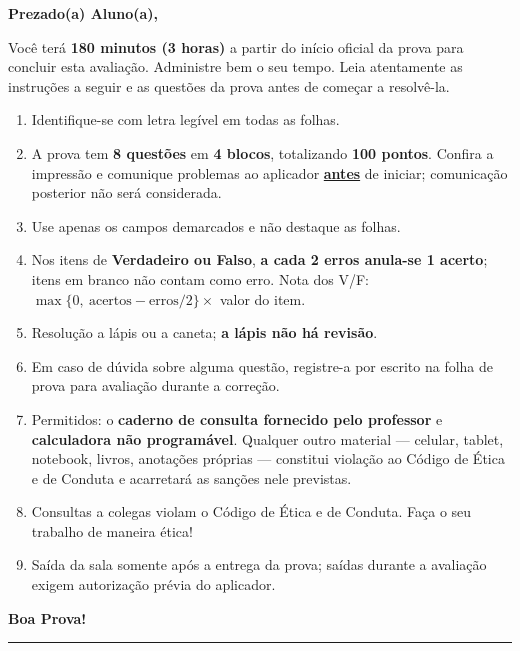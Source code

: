 \textbf{Prezado(a) Aluno(a),}

Você terá \textbf{180 minutos (3 horas)} a partir do início oficial da prova para
concluir esta avaliação. Administre bem o seu tempo. Leia atentamente as instruções a seguir e as
questões da prova antes de começar a resolvê-la.

\begin{small}
\begin{enumerate}[itemsep=0.12em, topsep=0.25em]
  \item Identifique-se com letra legível em todas as folhas.
  \item A prova tem \textbf{8 questões} em \textbf{4 blocos}, totalizando \textbf{100 pontos}.
        Confira a impressão e comunique problemas ao aplicador \underline{\textbf{antes}} de
        iniciar; comunicação posterior não será considerada.
  \item Use apenas os campos demarcados e não destaque as folhas.
  \item Nos itens de \textbf{Verdadeiro ou Falso}, \textbf{a cada 2 erros anula-se 1 acerto};
        itens em branco não contam como erro. Nota dos V/F:
        $\max\{0,\ \text{acertos} - \text{erros}/2\}\times$ valor do item.
  \item Resolução a lápis ou a caneta; \textbf{a lápis não há revisão}.
  \item Em caso de dúvida sobre alguma questão, registre-a por escrito na folha de prova para
        avaliação durante a correção.
  \item Permitidos: o \textbf{caderno de consulta fornecido pelo professor} e
        \textbf{calculadora não programável}. Qualquer outro material --- celular, tablet,
        notebook, livros, anotações próprias --- constitui violação ao Código de Ética e de
        Conduta e acarretará as sanções nele previstas.
  \item Consultas a colegas violam o Código de Ética e de Conduta. Faça o seu trabalho de maneira
        ética!
  \item Saída da sala somente após a entrega da prova; saídas durante a avaliação exigem
        autorização prévia do aplicador.
\end{enumerate}
\end{small}

\vspace{-0.4em}
\begin{flushright}\textbf{Boa Prova!}\end{flushright}

\vspace{-0.5em}
\noindent\rule{\linewidth}{0.6pt}

